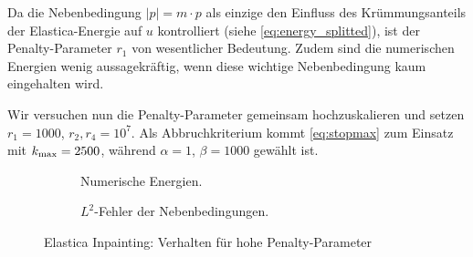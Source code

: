 \documentclass{mythesis}
\begin{document}
Da die Nebenbedingung $|p| = m \cdot p$ als einzige den Einfluss des Krümmungsanteils der Elastica-Energie auf $u$ kontrolliert (siehe \eqref{eq:energy_splitted}), ist der Penalty-Parameter $r_1$ von wesentlicher Bedeutung.
Zudem sind die numerischen Energien wenig aussagekräftig, wenn diese wichtige Nebenbedingung kaum eingehalten wird.

Wir versuchen nun die Penalty-Parameter gemeinsam hochzuskalieren und setzen $r_1 = 1000$, $r_2, r_4 = 10^7$.
Als Abbruchkriterium kommt \eqref{eq:stopmax} zum Einsatz mit $k_{\mathrm{max}} = 2500$, während $\alpha = 1$, $\beta = 1000$ gewählt ist.

\begin{figure}[ht]
    \begin{subfigure}{0.5\textwidth}
	\centering
	\caption{Numerische Energien.}
	\label{fig:num_eescale_energy}
    \end{subfigure}%
    \begin{subfigure}{0.5\textwidth}
	\centering
	\caption{$L^2$-Fehler der Nebenbedingungen.}
	\label{fig:num_eescale_constr}
    \end{subfigure}
    \caption{Elastica Inpainting: Verhalten für hohe Penalty-Parameter}
    \label{fig:num_eescale}
\end{figure}
\end{document}
